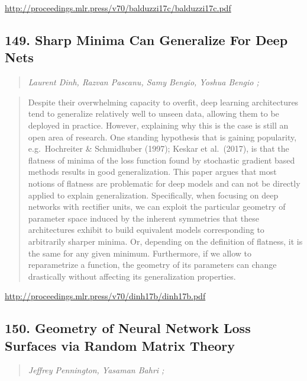 \documentclass{article}
\begin{document}
\href{http://proceedings.mlr.press/v70/balduzzi17c/balduzzi17c.pdf}{http://proceedings.mlr.press/v70/balduzzi17c/balduzzi17c.pdf}

\subsection{149. Sharp Minima Can Generalize For Deep Nets}

\begin{quote}
\footnotesize{\textit{Laurent Dinh, Razvan Pascanu, Samy Bengio, Yoshua Bengio ;}}
\end{quote}

\begin{quote}
    Despite their overwhelming capacity to overfit, deep learning architectures tend to generalize relatively well to unseen data, allowing them to be deployed in practice. However, explaining why this is the case is still an open area of research. One standing hypothesis that is gaining popularity, e.g.\ Hochreiter \& Schmidhuber (1997); Keskar et al.\ (2017), is that the flatness of minima of the loss function found by stochastic gradient based methods results in good generalization. This paper argues that most notions of flatness are problematic for deep models and can not be directly applied to explain generalization. Specifically, when focusing on deep networks with rectifier units, we can exploit the particular geometry of parameter space induced by the inherent symmetries that these architectures exhibit to build equivalent models corresponding to arbitrarily sharper minima. Or, depending on the definition of flatness, it is the same for any given minimum. Furthermore, if we allow to reparametrize a function, the geometry of its parameters can change drastically without affecting its generalization properties.  \end{quote}

\href{http://proceedings.mlr.press/v70/dinh17b/dinh17b.pdf}{http://proceedings.mlr.press/v70/dinh17b/dinh17b.pdf}

\subsection{150. Geometry of Neural Network Loss Surfaces via Random Matrix Theory}

\begin{quote}
\footnotesize{\textit{Jeffrey Pennington, Yasaman Bahri ;}}
\end{quote}
\end{document}
